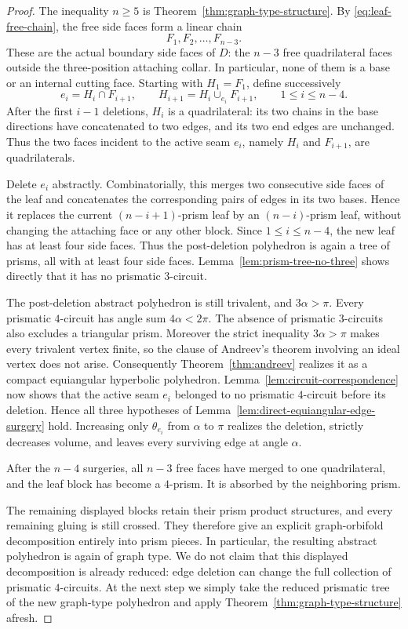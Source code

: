 \documentclass[12pt,a4paper]{article}
\theoremstyle{definition}
\begin{document}
\begin{proof}
The inequality \(n\ge5\) is
Theorem~\ref{thm:graph-type-structure}.  By \eqref{eq:leaf-free-chain}, the
free side faces form a linear chain
\[
        F_1,F_2,\ldots,F_{n-3}.
\]
These are the actual boundary side faces of \(D\): the \(n-3\) free
quadrilateral faces outside the three-position attaching collar.  In
particular, none of them is a base or an internal cutting face.
Starting with \(H_1=F_1\), define successively
\[
 e_i=H_i\cap F_{i+1},\qquad
 H_{i+1}=H_i\cup_{e_i}F_{i+1},\qquad
 1\le i\le n-4.
\]
After the first \(i-1\) deletions, \(H_i\) is a quadrilateral: its two chains
in the base directions have concatenated to two edges, and its two end edges
are unchanged.  Thus the two faces incident to the active seam \(e_i\), namely
\(H_i\) and \(F_{i+1}\), are quadrilaterals.

Delete \(e_i\) abstractly.  Combinatorially, this merges two consecutive
side faces of the leaf and concatenates the corresponding pairs of edges in
its two bases.  Hence it replaces the current \((n-i+1)\)-prism leaf by an
\((n-i)\)-prism leaf, without changing the attaching face or any other
block.  Since \(1\le i\le n-4\), the new leaf has at least four side faces.
Thus the post-deletion polyhedron is again a tree of prisms, all with at
least four side faces.  Lemma~\ref{lem:prism-tree-no-three} shows directly
that it has no prismatic \(3\)-circuit.

The post-deletion abstract polyhedron is still trivalent, and
\(3\alpha>\pi\).  Every prismatic \(4\)-circuit has angle sum
\(4\alpha<2\pi\).  The absence of prismatic \(3\)-circuits also excludes a
triangular prism.  Moreover the strict inequality
\(3\alpha>\pi\) makes every trivalent vertex finite, so the clause of
Andreev's theorem involving an ideal vertex does not arise.
Consequently Theorem~\ref{thm:andreev} realizes it as a compact equiangular
hyperbolic polyhedron.  Lemma~\ref{lem:circuit-correspondence} now shows that
the active seam \(e_i\) belonged to no prismatic \(4\)-circuit before its
deletion.  Hence all three hypotheses of
Lemma~\ref{lem:direct-equiangular-edge-surgery} hold.  Increasing only
\(\theta_{e_i}\) from \(\alpha\) to \(\pi\) realizes the deletion, strictly
decreases volume, and leaves every surviving edge at angle \(\alpha\).

After the \(n-4\) surgeries, all \(n-3\) free faces have merged to one
quadrilateral, and the leaf block has become a \(4\)-prism. It is absorbed by
the neighboring prism.

The remaining displayed blocks retain their prism product structures, and
every remaining gluing is still crossed.  They therefore give an explicit
graph-orbifold decomposition entirely into prism pieces.  In particular, the
resulting abstract polyhedron is again of graph type.  We do not claim that
this displayed decomposition is already reduced: edge
deletion can change the full collection of prismatic \(4\)-circuits.  At the
next step we simply take the reduced prismatic tree of the new graph-type
polyhedron and apply Theorem~\ref{thm:graph-type-structure} afresh.

\end{proof}
\end{document}
